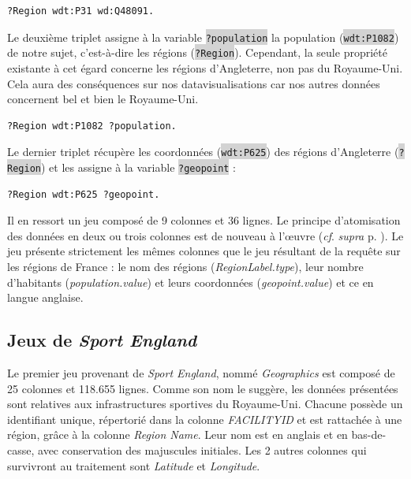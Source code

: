 \documentclass[hidelinks, 12pt]{report}
\newcommand{\code}[1]{\colorbox{LightGray}{\texttt{#1}}}
\begin{document}
\begin{lstlisting}[language=SPARQL]
	?Region wdt:P31 wd:Q48091.
\end{lstlisting}

Le deuxième triplet assigne à la variable \code{?population} la population (\code{wdt:P1082}) de notre sujet, c'est-à-dire les régions (\code{?Region}). Cependant, la seule propriété existante à cet égard concerne les régions d'Angleterre, non pas du Royaume-Uni. Cela aura des conséquences sur nos datavisualisations car nos autres données concernent bel et bien le Royaume-Uni.

\begin{lstlisting}[language=SPARQL]
	?Region wdt:P1082 ?population.
\end{lstlisting}

Le dernier triplet récupère les coordonnées (\code{wdt:P625}) des régions d'Angleterre (\code{?Region}) et les assigne à la variable \code{?geopoint} :

\begin{lstlisting}[language=SPARQL]
	?Region wdt:P625 ?geopoint.
\end{lstlisting}

Il en ressort un jeu composé de 9 colonnes et 36 lignes. Le principe d'atomisation des données en deux ou trois colonnes est de nouveau à l'œuvre (\textit{cf}. \textit{supra} p. \pageref{query1tab}). Le jeu présente strictement les mêmes colonnes que le jeu résultant de la requête sur les régions de France : le nom des régions (\textit{RegionLabel.type}), leur nombre d'habitants (\textit{population.value}) et leurs coordonnées (\textit{geopoint.value}) et ce en langue anglaise.





%





\subsection{Jeux de \textit{Sport England}}

Le premier jeu provenant de \textit{Sport England}, nommé \textit{Geographics} est composé de 25 colonnes et 118.655 lignes. Comme son nom le suggère, les données présentées sont relatives aux infrastructures sportives du Royaume-Uni. Chacune possède un identifiant unique, répertorié dans la colonne \textit{FACILITYID} et est rattachée à une région, grâce à la colonne \textit{Region Name}. Leur nom est en anglais et en bas-de-casse, avec conservation des majuscules initiales. Les 2 autres colonnes qui survivront au traitement sont \textit{Latitude} et \textit{Longitude}.
\end{document}
